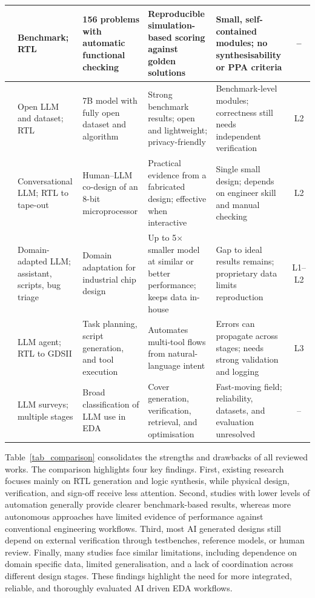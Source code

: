 \documentclass[conference]{IEEEtran}
\begin{document}
\begin{table}[!t]
\begin{tabularx}{\textwidth}{|c|p{2.2cm}|Y|Y|Y|c|}
\hline
\cite{P12_Liu2023} & Benchmark; RTL & 156 problems with automatic functional checking & Reproducible simulation-based scoring against golden solutions & Small, self-contained modules; no synthesisability or PPA criteria & -- \\
\hline
\cite{P4_Liu2025} & Open LLM and dataset; RTL & 7B model with fully open dataset and algorithm & Strong benchmark results; open and lightweight; privacy-friendly & Benchmark-level modules; correctness still needs independent verification & L2 \\
\hline
\cite{P13_Blocklove2023} & Conversational LLM; RTL to tape-out & Human--LLM co-design of an 8-bit microprocessor & Practical evidence from a fabricated design; effective when interactive & Single small design; depends on engineer skill and manual checking & L2 \\
\hline
\cite{P14_Liu2023ChipNeMo} & Domain-adapted LLM; assistant, scripts, bug triage & Domain adaptation for industrial chip design & Up to 5$\times$ smaller model at similar or better performance; keeps data in-house & Gap to ideal results remains; proprietary data limits reproduction & L1--L2 \\
\hline
\cite{P5_Wu2024} & LLM agent; RTL to GDSII & Task planning, script generation, and tool execution & Automates multi-tool flows from natural-language intent & Errors can propagate across stages; needs strong validation and logging & L3 \\
\hline
\cite{P6_Pan2025,P7_He2025} & LLM surveys; multiple stages & Broad classification of LLM use in EDA & Cover generation, verification, retrieval, and optimisation & Fast-moving field; reliability, datasets, and evaluation unresolved & -- \\
\hline
\end{tabularx}
\end{table}

\noindent Table~\ref{tab_comparison} consolidates the strengths and drawbacks of all reviewed works. The comparison highlights four key findings. First, existing research focuses mainly on RTL generation and logic synthesis, while physical design, verification, and sign-off receive less attention. Second, studies with lower levels of automation generally provide clearer benchmark-based results, whereas more autonomous approaches have limited evidence of performance against conventional engineering workflows. Third, most AI generated designs still depend on external verification through testbenches, reference models, or human review. Finally, many studies face similar limitations, including dependence on domain specific data, limited generalisation, and a lack of coordination across different design stages. These findings highlight the need for more integrated, reliable, and thoroughly evaluated AI driven EDA workflows.
\end{document}
